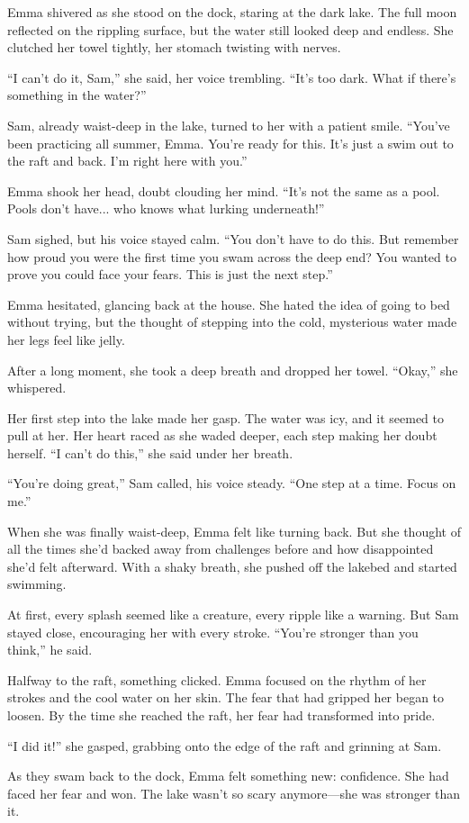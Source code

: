 \documentclass[12pt]{article}
\begin{document}
\begin{tcolorbox}[colframe=black!60, colback=white, 
coltitle=black, colbacktitle=black!15, fonttitle=\bfseries\Large, 
title=Text: A Midnight Swim, halign title=center, left=10pt, right=10pt, top=10pt, bottom=15pt]

Emma shivered as she stood on the dock, staring at the dark lake. The full moon reflected on the rippling surface, but the water still looked deep and endless. She clutched her towel tightly, her stomach twisting with nerves.

“I can’t do it, Sam,” she said, her voice trembling. “It’s too dark. What if there’s something in the water?”

Sam, already waist-deep in the lake, turned to her with a patient smile. “You’ve been practicing all summer, Emma. You’re ready for this. It’s just a swim out to the raft and back. I’m right here with you.”

Emma shook her head, doubt clouding her mind. “It’s not the same as a pool. Pools don’t have... who knows what lurking underneath!”

Sam sighed, but his voice stayed calm. “You don’t have to do this. But remember how proud you were the first time you swam across the deep end? You wanted to prove you could face your fears. This is just the next step.”

Emma hesitated, glancing back at the house. She hated the idea of going to bed without trying, but the thought of stepping into the cold, mysterious water made her legs feel like jelly.

After a long moment, she took a deep breath and dropped her towel. “Okay,” she whispered.

Her first step into the lake made her gasp. The water was icy, and it seemed to pull at her. Her heart raced as she waded deeper, each step making her doubt herself. “I can’t do this,” she said under her breath.

“You’re doing great,” Sam called, his voice steady. “One step at a time. Focus on me.”

When she was finally waist-deep, Emma felt like turning back. But she thought of all the times she’d backed away from challenges before and how disappointed she’d felt afterward. With a shaky breath, she pushed off the lakebed and started swimming.

At first, every splash seemed like a creature, every ripple like a warning. But Sam stayed close, encouraging her with every stroke. “You’re stronger than you think,” he said.

Halfway to the raft, something clicked. Emma focused on the rhythm of her strokes and the cool water on her skin. The fear that had gripped her began to loosen. By the time she reached the raft, her fear had transformed into pride.

“I did it!” she gasped, grabbing onto the edge of the raft and grinning at Sam.

As they swam back to the dock, Emma felt something new: confidence. She had faced her fear and won. The lake wasn’t so scary anymore—she was stronger than it.


\end{tcolorbox}
\end{document}
